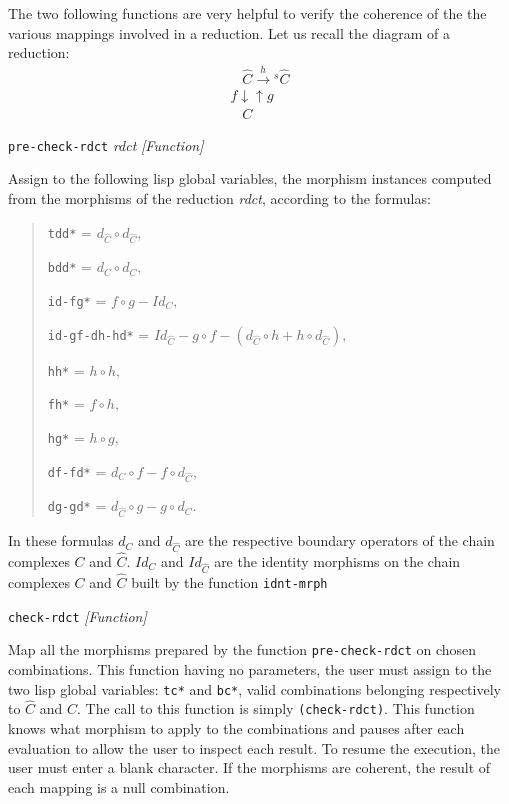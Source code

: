 The two following functions are very helpful to verify the coherence of the
the various mappings involved in a reduction. Let us recall the diagram
of a reduction:
$$
\begin{array}{l}
\hspace{10pt} \hat{C} \stackrel{h}{\longrightarrow}\mbox{$^s\hat{C}$} \\
{\scriptstyle f} \downarrow \uparrow {\scriptstyle g}\\
\hspace{10pt} C
\end{array}
$$
\newpage
{\parindent=0mm
{\leftskip=5mm
{\tt pre-check-rdct} {\em rdct} \hfill {\em [Function]} \par}
{\leftskip=15mm
Assign to the following lisp global variables, the morphism instances computed
from the morphisms of the reduction {\em rdct}, according to the  formulas:\par}
{\leftskip 20mm
\begin{quotation}
  {\tt *tdd*}  = $ d_{\hat C} \circ d_{\hat C},$

  {\tt *bdd*}  = $ d_C \circ d_C ,$

  {\tt *id-fg*}  = $  f \circ g - Id_C,$

  {\tt *id-gf-dh-hd*}  = $ Id_{\hat C} - g \circ f - (d_{\hat C} \circ h + h \circ d_{\hat C}),$

  {\tt *hh*}  = $ h \circ h,$

  {\tt *fh*}  = $ f \circ h,$

  {\tt *hg*}  = $ h \circ g,$

  {\tt *df-fd*}  = $  d_C \circ f - f \circ d_{\hat C},$

  {\tt *dg-gd*}  = $  d_{\hat C} \circ g - g \circ d_C.$

\end{quotation} \par}
{\leftskip=15mm
In these formulas  $d_C$ and $d_{\hat C}$ are the respective boundary operators of the
chain complexes $C$ and $\hat C$. $Id_C$ and $Id_{\hat C}$ are the identity morphisms
on the chain complexes $C$ and $\hat C$  built by the function {\tt idnt-mrph} \par}
{\leftskip=5mm
{\tt check-rdct} \hfill {\em [Function]} \par}
{\leftskip=15mm
Map  all the morphisms prepared by the function {\tt pre-check-rdct} on chosen combinations.
This function having no parameters, the user must  assign
to  the two lisp global variables:
{\tt *tc*} and {\tt *bc*},  valid combinations belonging respectively to $\hat C$ and $C$.
The call to this
function is simply {\tt (check-rdct)}. This function knows what morphism to apply
to the combinations and pauses after each evaluation to allow the user to inspect each result.
To resume the execution, the user must enter a blank character.
If the morphisms are coherent, the result of each mapping is a null combination. \par}
}
\newpage

